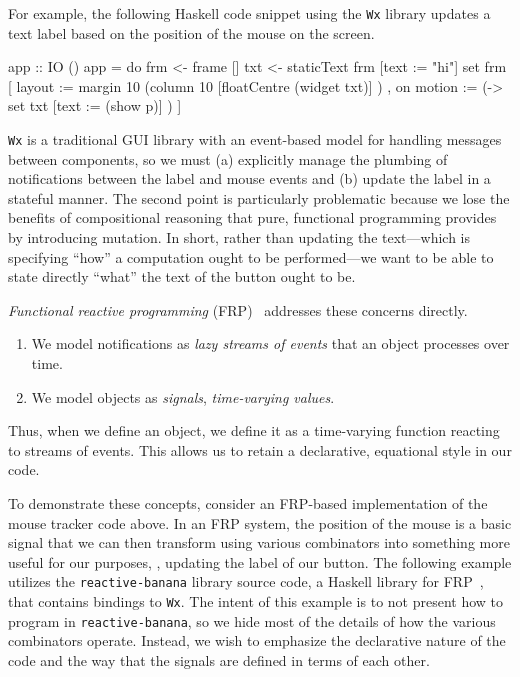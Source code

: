For example, the following Haskell code snippet using the \texttt{Wx} library updates a text label  based on the position of the mouse on the screen.
\begin{haskellcode}
app :: IO ()
app = do
  frm <- frame []
  txt <- staticText frm [text := "hi"]
  set frm
    [ layout := margin 10 (column 10 [floatCentre (widget txt)] )
    , on motion := (\p -> set txt [text := (show p)] ) ]
\end{haskellcode}
\texttt{Wx} is a traditional GUI library with an event-based model for handling messages between components, so we must (a) explicitly manage the plumbing of notifications between the label and mouse events and (b) update the label in a stateful manner.
The second point is particularly problematic because we lose the benefits of compositional reasoning that pure, functional programming provides by introducing mutation.
In short, rather than updating the text---which is specifying ``how'' a computation ought to be performed---we want to be able to state directly ``what'' the text of the button ought to be.

\emph{Functional reactive programming} (FRP)~\cite{elliott1997, czaplicki2013, finkbeiner2019, jeffrey2012} addresses these concerns directly.
\begin{enumerate}[itemsep=0pt]
  \item We model notifications as \emph{lazy streams of events} that an object processes over time.
  \item We model objects as \emph{signals}, \emph{time-varying values}.
\end{enumerate}
Thus, when we define an object, we define it as a time-varying function reacting to streams of events.
This allows us to retain a declarative, equational style in our code.

To demonstrate these concepts, consider an FRP-based implementation of the mouse tracker code above.
In an FRP system, the position of the mouse is a basic signal that we can then transform using various combinators into something more useful for our purposes, \eg, updating the label of our button.
The following example utilizes the \texttt{reactive-banana} library source code, a Haskell library for FRP~\cite{reactive-banana}, that contains bindings to \texttt{Wx}.
The intent of this example is to not present how to program in \texttt{reactive-banana}, so we hide most of the details of how the various combinators operate.
Instead, we wish to emphasize the declarative nature of the code and the way that the signals are defined in terms of each other.

